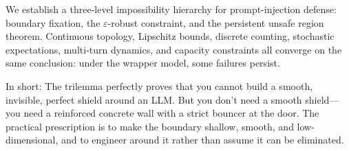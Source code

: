 \documentclass[11pt]{article}
\begin{document}
We establish a three-level impossibility hierarchy for prompt-injection
defense: boundary fixation, the $\varepsilon$-robust constraint, and the
persistent unsafe region theorem. Continuous topology, Lipschitz bounds,
discrete counting, stochastic expectations, multi-turn dynamics, and
capacity constraints all converge on the same conclusion: under the
wrapper model, some failures persist. 

In short: The trilemma perfectly proves that you cannot build a smooth, invisible, perfect shield around an LLM. But you don't need a smooth shield—you need a reinforced concrete wall with a strict bouncer at the door. The practical prescription is to
make the boundary shallow, smooth, and low-dimensional, and to engineer
around it rather than assume it can be eliminated.


\end{document}
